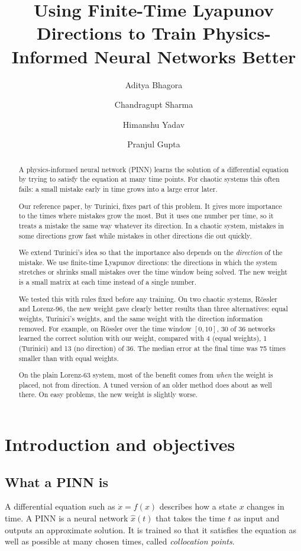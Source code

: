 \documentclass[11pt,a4paper]{article}
\title{Using Finite-Time Lyapunov Directions to Train Physics-Informed Neural Networks Better}
\author{Aditya Bhagora \and Chandragupt Sharma \and Himanshu Yadav \and Pranjul Gupta}
\date{}
\begin{document}
\maketitle

\begin{abstract}
A physics-informed neural network (PINN) learns the solution of a differential equation by
trying to satisfy the equation at many time points. For chaotic systems this often fails:
a small mistake early in time grows into a large error later.

Our reference paper, by Turinici, fixes part of this problem. It gives more importance to
the times where mistakes grow the most. But it uses one number per time, so it treats a
mistake the same way whatever its direction. In a chaotic system, mistakes in some
directions grow fast while mistakes in other directions die out quickly.

We extend Turinici's idea so that the importance also depends on the \emph{direction} of the
mistake. We use finite-time Lyapunov directions: the directions in which the system
stretches or shrinks small mistakes over the time window being solved. The new weight is a
small matrix at each time instead of a single number.

We tested this with rules fixed before any training. On two chaotic systems, Rössler and
Lorenz-96, the new weight gave clearly better results than three alternatives: equal
weights, Turinici's weights, and the same weight with the direction information removed.
For example, on Rössler over the time window $[0,10]$, 30 of 36 networks learned the
correct solution with our weight, compared with 4 (equal weights), 1 (Turinici) and 13
(no direction) of 36. The median error at the final time was 75 times smaller than with equal weights.

On the plain Lorenz-63 system, most of the benefit comes from \emph{when} the weight is
placed, not from direction. A tuned version of an older method does about as well there.
On easy problems, the new weight is slightly worse.
\end{abstract}

\tableofcontents
\newpage

\section{Introduction and objectives}

\subsection{What a PINN is}
A differential equation such as $\dot x = f(x)$ describes how a state $x$ changes in time.
A PINN \cite{raissi2019} is a neural network $\hat x(t)$ that takes the time $t$ as input
and outputs an approximate solution. It is trained so that it satisfies the equation as
well as possible at many chosen times, called \emph{collocation points}.
\end{document}
